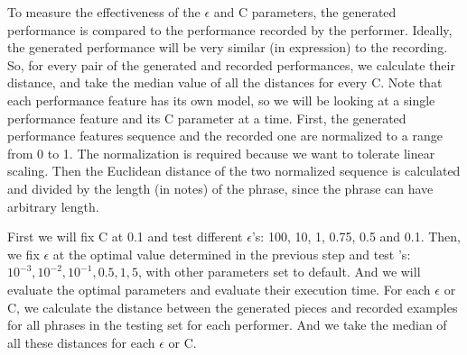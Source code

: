 To measure the effectiveness of the $\epsilon$ and C parameters, the generated performance is compared to the performance recorded by the performer. Ideally, the generated performance will be very similar (in expression) to the recording. So, for every pair of the generated and recorded performances, we calculate their distance, and take the median value of all the distances for every C. Note that each performance feature has its own model, so we will be looking at a single performance feature and its C parameter at a time.  
First, the generated performance features sequence and the recorded one are normalized to a range from 0 to 1. The normalization is required because we want to tolerate linear scaling. Then the Euclidean distance of the two normalized sequence is calculated and divided by the length (in notes) of the phrase, since the phrase can have arbitrary length.


First we will fix C at 0.1 and test different $\epsilon$'s: 100, 10, 1, 0.75, 0.5 and 0.1. Then, we fix $\epsilon$ at the optimal value determined in the previous step and test 's: $10^{-3}, 10^{-2}, 10^{-1}, 0.5, 1, 5$, with other parameters set to default. And we will evaluate the optimal parameters and evaluate their execution time. For each $\epsilon$ or C, we calculate the distance between the generated pieces and recorded examples for all phrases in the testing set for each performer. And we take the median of all these distances for each $\epsilon$ or C.



